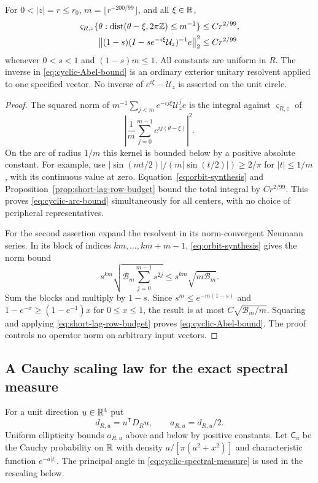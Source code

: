 \begin{theorem}
\label{thm:cyclic-peripheral-bounds}
For $0<|z|=r\le r_0$, $m=\lfloor r^{-200/99}\rfloor$, and all
$\xi\in\mathbb R$,
\begin{align}
 \varsigma_{R,z}\{\theta:
   \operatorname{dist}(\theta-\xi,2\pi\Z)\le m^{-1}\}
                                      &\le Cr^{2/99},
                              \label{eq:cyclic-arc-bound}\\
 \left\|(1-s)(I-se^{-i\xi}\mathcal U_z)^{-1}e\right\|_2^2
                                      &\le Cr^{2/99}
                              \label{eq:cyclic-Abel-bound}
\end{align}
whenever $0<s<1$ and $(1-s)m\le1$. All constants are uniform in $R$.
The inverse in \eqref{eq:cyclic-Abel-bound} is an ordinary exterior
unitary resolvent applied to one specified vector. No inverse of
$e^{i\xi}-\mathcal U_z$ is asserted on the unit circle.
\end{theorem}
\begin{proof}
The squared norm of
$m^{-1}\sum_{j<m}e^{-ij\xi}\mathcal U_z^je$ is the integral against
$\varsigma_{R,z}$ of
\[
 \left|\frac1m\sum_{j=0}^{m-1}e^{ij(\theta-\xi)}\right|^2.
\]
On the arc of radius $1/m$ this kernel is bounded below by a positive
absolute constant. For example, use
$|\sin(m t/2)|/(m|\sin(t/2)|)\ge2/\pi$ for $|t|\le1/m$,
with its continuous value at zero. Equation~\eqref{eq:orbit-synthesis}
and Proposition~\ref{prop:short-lag-row-budget} bound the total integral
by $Cr^{2/99}$. This proves \eqref{eq:cyclic-arc-bound} simultaneously
for all centers, with no choice of peripheral representatives.

For the second assertion expand the resolvent in its norm-convergent
Neumann series. In its block of indices $km,\ldots,km+m-1$,
\eqref{eq:orbit-synthesis} gives the norm bound
\[
 s^{km}\sqrt{\mathcal B_m\sum_{j=0}^{m-1}s^{2j}}
                         \le s^{km}\sqrt{m\mathcal B_m}.
\]
Sum the blocks and multiply by $1-s$. Since
$s^m\le e^{-m(1-s)}$ and
$1-e^{-x}\ge(1-e^{-1})x$ for $0\le x\le1$, the result is at most
$C\sqrt{\mathcal B_m/m}$. Squaring and applying
\eqref{eq:short-lag-row-budget} proves \eqref{eq:cyclic-Abel-bound}.
The proof controls no operator norm on arbitrary input vectors.
\end{proof}

\subsection{A Cauchy scaling law for the exact spectral measure}
For a unit direction $u\in\mathbb R^4$ put
\[
 d_{R,u}=u^{\mathsf T}D_Ru,\qquad a_{R,u}=d_{R,u}/2.
\]
Uniform ellipticity bounds $a_{R,u}$ above and below by positive
constants. Let $\mathsf C_a$ be the Cauchy probability on $\mathbb R$ with
density $a/[\pi(a^2+x^2)]$ and characteristic function $e^{-a|t|}$.
The principal angle in \eqref{eq:cyclic-spectral-measure} is used
in the rescaling below.

